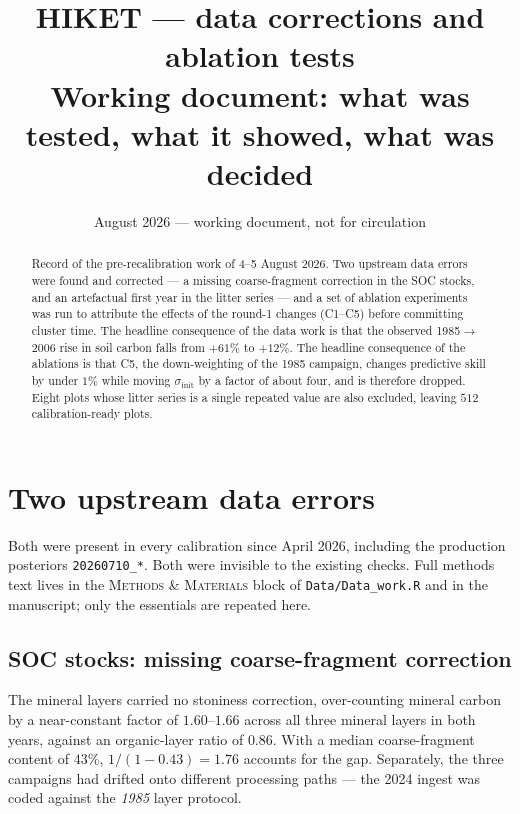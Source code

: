 \documentclass[11pt]{article}
\title{HIKET --- data corrections and ablation tests\\
  \large Working document: what was tested, what it showed, what was decided}
\author{}
\date{August 2026 --- working document, not for circulation}
\newcommand{\sinit}{\sigma_{\mathrm{init}}}
\begin{document}
\maketitle

\begin{abstract}
\noindent Record of the pre-recalibration work of 4--5 August 2026. Two upstream data errors
were found and corrected --- a missing coarse-fragment correction in the SOC stocks, and an
artefactual first year in the litter series --- and a set of ablation experiments was run to
attribute the effects of the round-1 changes (C1--C5) before committing cluster time. The
headline consequence of the data work is that the observed 1985$\rightarrow$2006 rise in soil
carbon falls from $+61\%$ to $+12\%$. The headline consequence of the ablations is that C5,
the down-weighting of the 1985 campaign, changes predictive skill by under $1\%$ while moving
$\sinit$ by a factor of about four, and is therefore dropped. Eight plots whose litter series is
a single repeated value are also excluded, leaving $512$ calibration-ready plots.
\end{abstract}

\tableofcontents

\section{Two upstream data errors}

Both were present in every calibration since April 2026, including the production
posteriors \texttt{20260710\_*}. Both were invisible to the existing checks. Full
methods text lives in the \textsc{Methods \& Materials} block of \texttt{Data/Data\_work.R}
and in the manuscript; only the essentials are repeated here.

\subsection{SOC stocks: missing coarse-fragment correction}
The mineral layers carried no stoniness correction, over-counting mineral carbon by a
near-constant factor of $1.60$--$1.66$ across all three mineral layers in both years, against
an organic-layer ratio of $0.86$. With a median coarse-fragment content of $43\%$,
$1/(1-0.43)=1.76$ accounts for the gap. Separately, the three campaigns had drifted onto
different processing paths --- the 2024 ingest was coded against the \emph{1985} layer protocol.
\end{document}
